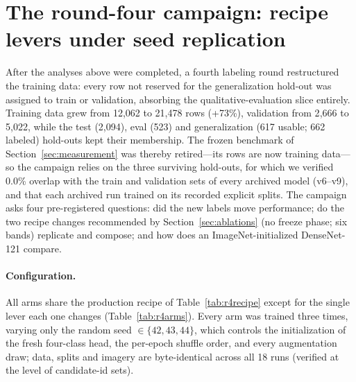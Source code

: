 \documentclass[11pt,a4paper]{article}
\begin{document}
\section{The round-four campaign: recipe levers under seed replication}
\label{sec:round4}

After the analyses above were completed, a fourth labeling round restructured
the training data: every row not reserved for the generalization hold-out was
assigned to train or validation, absorbing the qualitative-evaluation slice
entirely. Training data grew from 12{,}062 to 21{,}478 rows (+73\%), validation
from 2{,}666 to 5{,}022, while the test (2{,}094), eval (523) and generalization
(617 usable; 662 labeled) hold-outs kept their membership. The frozen benchmark
of Section~\ref{sec:measurement} was thereby retired---its rows are now training
data---so the campaign relies on the three surviving hold-outs, for which we
verified 0.0\% overlap with the train and validation sets of every archived
model (v6--v9), and that each archived run trained on its recorded explicit
splits. The campaign asks four pre-registered questions: did the new labels
move performance; do the two recipe changes recommended by
Section~\ref{sec:ablations} (no freeze phase; six bands) replicate and compose;
and how does an ImageNet-initialized DenseNet-121 compare.

\paragraph{Configuration.} All arms share the production recipe of
Table~\ref{tab:r4recipe} except for the single lever each one changes
(Table~\ref{tab:r4arms}). Every arm was trained three times, varying only the
random seed $\in\{42,43,44\}$, which controls the initialization of the fresh
four-class head, the per-epoch shuffle order, and every augmentation draw;
data, splits and imagery are byte-identical across all 18 runs (verified at the
level of candidate-id sets).
\end{document}
